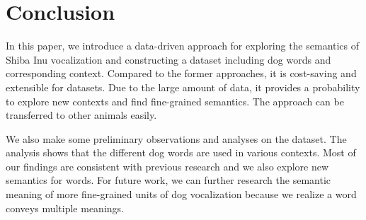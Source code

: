 \section{Conclusion}
In this paper, we introduce a data-driven approach for exploring the semantics of Shiba Inu vocalization and constructing a dataset including dog words and corresponding context. Compared to the former approaches, it is cost-saving and extensible for datasets. Due to the large amount of data, it provides a probability to explore new contexts and find fine-grained semantics. The approach can be transferred to other animals easily. 

We also make some preliminary observations and analyses on the dataset. The analysis shows that the different dog words are used in various contexts. Most of our findings are consistent with previous research and we also explore new semantics for words. For future work, we can further research the semantic meaning of more fine-grained units of dog vocalization because we realize a word conveys multiple meanings. 

